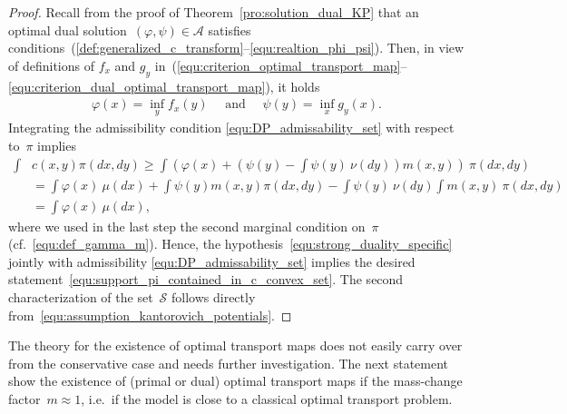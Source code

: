 \documentclass{article}
\theoremstyle{definition}
\def\cS{\mathcal{S}}
\begin{document}
    \begin{proof}
    Recall from the proof of Theorem~\ref{pro:solution_dual_KP} that an optimal dual solution~$(\varphi, \psi) \in \mathcal{A}$ satisfies conditions~(\ref{def:generalized_c_transform}--\ref{equ:realtion_phi_psi}). Then, in view of definitions of $f_x$ and $g_y$ in~(\ref{equ:criterion_optimal_transport_map}--\ref{equ:criterion_dual_optimal_transport_map}), it holds
    \begin{align}\label{equ:assumption_kantorovich_potentials}
        \varphi(x) = \inf_y f_x(y) \quad \mbox{ and } \quad \psi(y) = \inf_x g_y(x).
    \end{align}
    Integrating the admissibility condition \eqref{equ:DP_admissability_set} with respect to~$\pi$ implies
    \begin{align*}
        \int & c(x,y) \pi(dx, dy)  \geq \int \left( \varphi(x) + \left( \psi(y) - \int \psi(y) \ \nu(dy) \right) m(x,y) \right) \ \pi(dx, dy) \\
        & = \int \varphi(x) \ \mu(dx) + \int \psi(y) m(x,y) \pi(dx, dy) - \int \psi(y) \ \nu(dy) \int  m(x,y)  \ \pi(dx, dy) \\
        & = \int \varphi(x) \ \mu(dx),
    \end{align*}
    where we used in the last step the second marginal condition on~$\pi$ (cf.~\eqref{equ:def_gamma_m}). Hence, the hypothesis~\eqref{equ:strong_duality_specific} jointly with admissibility \eqref{equ:DP_admissability_set} implies the desired statement~\eqref{equ:support_pi_contained_in_c_convex_set}. The second characterization of the set~$\cS$ follows directly from~\eqref{equ:assumption_kantorovich_potentials}.
    \end{proof}



The theory for the existence of optimal transport maps does not easily carry over from the conservative case and needs further investigation. The next statement show the existence of (primal or dual) optimal transport maps if the mass-change factor~$m \approx 1$, i.e.~if the model is close to a classical optimal transport problem. 
\end{document}
